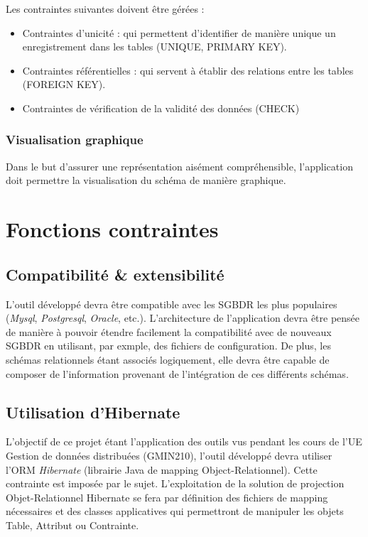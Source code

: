 				Les contraintes suivantes doivent être gérées : 
				
				\begin{itemize}
				\item Contraintes d'unicité : qui permettent d'identifier de manière unique un enregistrement dans les tables (UNIQUE, PRIMARY KEY).
				\item Contraintes référentielles : qui servent à établir des relations entre les tables (FOREIGN KEY).
				\item Contraintes de vérification de la validité des données (CHECK)
				\end{itemize}
				
		\subsubsection{Visualisation graphique}
		Dans le but d'assurer une représentation aisément compréhensible, l'application doit permettre la visualisation du schéma de manière graphique.

\section{Fonctions contraintes}
	\subsection{Compatibilité \& extensibilité}
	L'outil développé devra être compatible avec les SGBDR les plus populaires (\emph{Mysql}, \emph{Postgresql}, \emph{Oracle}, etc.). L'architecture de l'application devra être pensée de manière à pouvoir étendre facilement la compatibilité avec de nouveaux SGBDR en utilisant, par exmple, des fichiers de configuration. De plus, les schémas relationnels étant associés logiquement, elle devra être capable de composer de l’information provenant de l’intégration de ces différents schémas.
	\subsection{Utilisation d'Hibernate}
	L'objectif de ce projet étant l'application des outils vus pendant les cours de l'UE Gestion de données distribuées (GMIN210), l'outil développé devra utiliser l'ORM \emph{Hibernate} (librairie Java de mapping Object-Relationnel). Cette contrainte est imposée par le sujet. L'exploitation de la solution de projection Objet-Relationnel Hibernate se fera par définition des fichiers de mapping nécessaires et des classes applicatives qui permettront de manipuler les objets Table, Attribut ou Contrainte.
